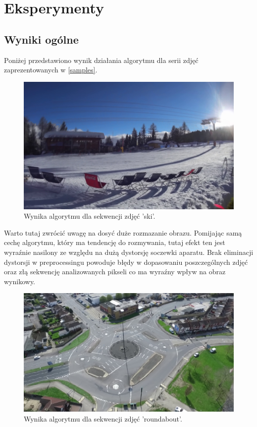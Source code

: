 \chapter{Eksperymenty}
\section{Wyniki ogólne}
Poniżej przedstawiono wynik działania algorytmu dla serii zdjęć zaprezentowanych w \ref{samples}.

\begin{figure}[H]
	\centering
		\includegraphics[width=1.0\linewidth]{img/ski_out.png}
	\caption[Wynika dla sekwencji zdjęć 'ski'.]{Wynika algorytmu dla sekwencji zdjęć 'ski'.}
	\label{fig:binary}
\end{figure}

Warto tutaj zwrócić uwagę na dosyć duże rozmazanie obrazu. Pomijając samą cechę algorytmu, który ma tendencję do rozmywania, tutaj efekt ten jest wyraźnie nasilony ze względu na dużą dystorsję soczewki aparatu. Brak eliminacji dystorsji w preprocessingu powoduje błędy w dopasowaniu poszczególnych zdjęć oraz złą sekwencję analizowanych pikseli co ma wyraźny wpływ na obraz wynikowy.

\begin{figure}[H]
	\centering
		\includegraphics[width=1.0\linewidth]{img/roundabout_out.png}
	\caption[Wynika dla sekwencji zdjęć 'roundabout'.]{Wynika algorytmu dla sekwencji zdjęć 'roundabout'.}
	\label{fig:binary}
\end{figure}

